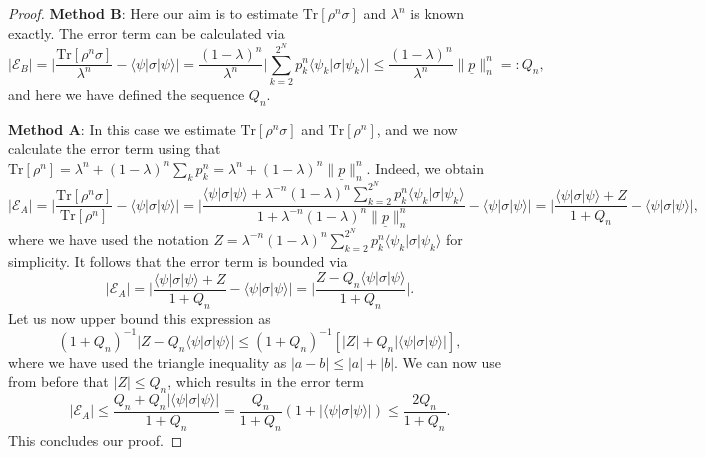 \documentclass[aps,prx,showpacs,twocolumn,reprint]{revtex4-2}
\newcommand{\tr}{\mathrm{Tr}}
\newcommand{\qn}{Q_n}
\begin{document}
{\begin{proof}
	\textbf{Method B}: Here our aim is to estimate $\tr[\rho^n \sigma] $ and $\lambda^n$ is known exactly.
	The error term can be calculated via
	\begin{equation}
	\lvert \mathcal{E}_B \rvert
	=
	\lvert \frac{\tr[\rho^n \sigma]}{\lambda^n} -  \langle\psi |\sigma | \psi \rangle \rvert
	=
	 \frac{(1-\lambda)^n}{\lambda^n}  \lvert \sum_{k=2}^{2^N} p^n_k \langle\psi_k |\sigma | \psi_k \rangle \rvert
	 \leq \frac{(1-\lambda)^n}{\lambda^n} \lVert \underline{p} \rVert^n_n =: \qn,
	\end{equation}
	and here we have defined the sequence $Q_n$.
	
	\textbf{Method A}: In this case we estimate $\tr[\rho^n \sigma] $  and $\tr[\rho^n]$, and we now calculate the error term
	using that $\tr[\rho^n] = \lambda^n + (1-\lambda)^n \sum_k p_k^n = \lambda^n + (1-\lambda)^n	 \lVert \underline{p} \rVert^n_n$. Indeed, we obtain
	\begin{equation}
	\lvert \mathcal{E}_A \rvert
	=
	\lvert \frac{\tr[\rho^n \sigma]}{\tr[\rho^n]} -  \langle\psi |\sigma | \psi \rangle \rvert
	=
	\lvert \frac{
		 \langle\psi |\sigma | \psi \rangle + \lambda^{-n}(1-\lambda)^n \sum_{k=2}^{2^N} p^n_k \langle\psi_k |\sigma | \psi_k \rangle
	}{
	1 + \lambda^{-n} (1-\lambda)^n  \lVert \underline{p} \rVert^n_n 
	}
	-  \langle\psi |\sigma | \psi \rangle \rvert
	= \lvert \frac{\langle\psi |\sigma | \psi \rangle  + Z}{1 + \qn} - \langle\psi |\sigma | \psi \rangle \rvert,
	\end{equation}
	where we have used the notation $Z = \lambda^{-n}(1-\lambda)^n \sum_{k=2}^{2^N} p^n_k \langle\psi_k |\sigma | \psi_k \rangle$
	for simplicity.
	It follows that the error term is bounded via
	\begin{equation}
	\lvert \mathcal{E}_A \rvert = \lvert \frac{\langle\psi |\sigma | \psi \rangle + Z}{1 + \qn} - \langle\psi |\sigma | \psi \rangle \rvert
	=
	\lvert \frac{ Z - \qn \langle\psi |\sigma | \psi \rangle }{1 + \qn}  \rvert.
	\end{equation}
	Let us now upper bound this expression as
	\begin{equation}	
	 (1+\qn)^{-1} \lvert Z - \qn \langle\psi |\sigma | \psi \rangle \rvert 
	\leq (1+\qn)^{-1} [ \lvert Z \rvert  + \qn \lvert \langle\psi |\sigma | \psi \rangle \rvert],
	\end{equation}
	where we have used the triangle inequality as $|a-b| \leq |a|+|b|$.
	We can now use from before that $\lvert Z \rvert \leq \qn$, which results in the error term
	\begin{equation}
	\lvert \mathcal{E}_A \rvert \leq 
	\frac{\qn+\qn \lvert \langle\psi |\sigma | \psi \rangle \rvert}{1+\qn}
	= \frac{\qn}{1+\qn} (1+\lvert \langle\psi |\sigma | \psi \rangle \rvert)
	\leq\frac{2\qn}{1+\qn}.
	\end{equation}
	This concludes our proof.
	

\end{proof}}
\end{document}
